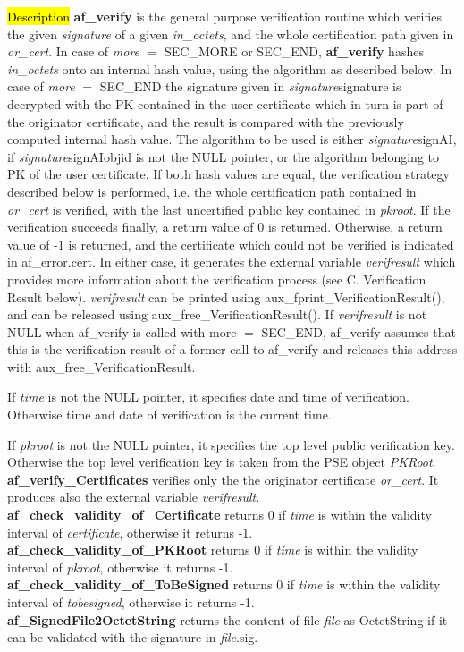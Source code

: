\hl{Description}
{\bf af\_verify} is the general purpose verification routine which verifies the given
{\em signature} of a given {\em in\_octets}, and the whole certification path given
in {\em or\_cert}. 
In case of {\em more} $=$ SEC\_MORE or SEC\_END, {\bf af\_verify} hashes {\em in\_octets} onto
an internal hash value, using the algorithm as described below.
In case of {\em more} $=$ SEC\_END the signature given in {\em signature}\pf signature
is decrypted with the PK contained in the user certificate which in turn is part of the
originator certificate, and the result is compared
with the previously computed internal hash value. The algorithm to be used is either 
{\em signature}\pf signAI, if {\em signature}\pf signAI\pf objid is not the
NULL pointer, or the algorithm belonging to PK of the user certificate. If both hash values
are equal, the verification strategy described below is performed, i.e. the whole certification path
contained in {\em or\_cert} is verified, with the last uncertified public key
contained in {\em pkroot}. If the verification succeeds finally, a return value
of 0 is returned. Otherwise, a return value of -1 is returned, and the certificate which could
not be verified is indicated in af\_error.cert. In either case, it generates the external
variable {\em verifresult} which provides more information about the verification process (see C. Verification Result below).
{\em verifresult} can be printed using aux\_fprint\_VerificationResult(), and can be released
using aux\_free\_VerificationResult(). If {\em verifresult} is not NULL when af\_verify is
called with more $=$ SEC\_END, af\_verify assumes that this is the verification result of a former call to
af\_verify and releases this address with aux\_free\_VerificationResult.

If {\em time} is not the NULL pointer, it specifies date and time of verification. Otherwise
time and date of verification is the current time.

If {\em pkroot} is not the NULL pointer, it specifies the top level public verification key.
Otherwise the top level verification key is taken from the PSE object {\em PKRoot}. \\ [1em]
{\bf af\_verify\_Certificates} verifies only the the originator certificate {\em or\_cert}.
It produces also the external variable {\em verifresult}.
\\ [1em]
{\bf af\_check\_validity\_of\_Certificate} returns 0 if {\em time} is within the validity interval
of {\em certificate}, otherwise it returns -1.
\\ [1em]
{\bf af\_check\_validity\_of\_PKRoot} returns 0 if {\em time} is within the validity interval
of {\em pkroot}, otherwise it returns -1.
\\ [1em]
{\bf af\_check\_validity\_of\_ToBeSigned} returns 0 if {\em time} is within the validity interval
of {\em tobesigned}, otherwise it returns -1.
\\ [1em]
{\bf af\_SignedFile2OctetString} returns the content of file {\em file} as OctetString
if it can be validated with the signature in {\em file}.sig.
 
